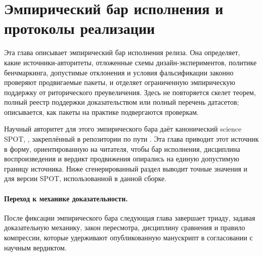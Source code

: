 \section{Эмпирический бар исполнения и протоколы реализации}
\label{sec:oc-core-1-3-empirical-execution-protocols}

Эта глава описывает эмпирический бар исполнения релиза. Она определяет, какие
источники-авторитеты, отложенные схемы дизайн-экспериментов, политике
бенчмаркинга, допустимые отклонения и условия фальсификации законно
проверяют продвигаемые пакеты, и отделяет ограниченную эмпирическую
поддержку от риторического преувеличения. Здесь не повторяется
скелет теорем, полный реестр поддержки доказательством или полный перечень
датасетов; описывается, как пакеты на практике подвергаются проверкам.

Научный авторитет для этого эмпирического бара даёт канонический
science SPOT, , закреплённый в репозитории
по пути .
Эта глава приводит этот источник в форму, ориентированную на читателя, чтобы
бар исполнения, дисциплина воспроизведения и вердикт продвижения опирались на
единую допустимую границу источника. Ниже сгенерированный раздел выводит
точные значения  и 
для версии SPOT, использованной в данной сборке.

\begingroup
\small

\endgroup

\paragraph{Переход к механике доказательности.}
После фиксации эмпирического бара следующая глава завершает триаду, задавая
доказательную механику, закон пересмотра, дисциплину сравнения и правило
компрессии, которые удерживают опубликованную манускрипт в согласовании с
научным вердиктом.
